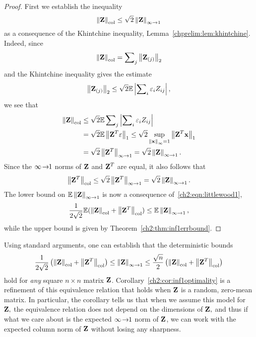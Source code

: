 \begin{proof}
 First we establish the inequality
 \begin{equation}
  \left\|\mathbf{Z}\right\|_{\mathrm{col}} \leq \sqrt{2} \left\|\mathbf{Z}\right\|_{\infty\rightarrow 1}
  \label{ch2:eqn:littlewood1}
 \end{equation}
as a consequence of the Khintchine inequality, Lemma~\ref{chprelim:lem:khintchine}.
Indeed, since 
\[
 \left\|\mathbf{Z}\right\|_{\mathrm{col}} = \sum\nolimits_j \left\|\mathbf{Z}_{(j)}\right\|_2  
\]
and the Khintchine inequality gives the estimate
\[
 \left\|\mathbf{Z}_{(j)}\right\|_2 \leq \sqrt{2} \mathbb{E} \left| \sum\nolimits_i \varepsilon_i Z_{ij} \right|,
\]
we see that
\begin{align*}
 \left\|\mathbf{Z}\right\|_{\mathrm{col}} & \leq \sqrt{2} \mathbb{E} \sum\nolimits_j \left| \sum\nolimits_i \varepsilon_i Z_{ij} \right| \\
     & = \sqrt{2} \mathbb{E} \left\|\mathbf{Z}^T \mathbf{\varepsilon}\right\|_1 
        \leq \sqrt{2} \sup_{\left\|\mathbf{x}\right\|_\infty = 1} \left\|\mathbf{Z}^T \mathbf{x}\right\|_1 \\
     & = \sqrt{2} \left\|\mathbf{Z}^T\right\|_{\infty\rightarrow 1} = \sqrt{2} \left\|\mathbf{Z}\right\|_{\infty\rightarrow 1}.
\end{align*}
Since the $\infty\!\rightarrow\!\!1$ norms of $\mathbf{Z}$ and $\mathbf{Z}^T$ are equal, it also follows that
\[
 \left\|\mathbf{Z}^T\right\|_{\mathrm{col}} \leq \sqrt{2} \left\|\mathbf{Z}^T\right\|_{\infty\rightarrow 1} = \sqrt{2} \left\|\mathbf{Z}\right\|_{\infty\rightarrow 1}.
\]
The lower bound on $ \mathbb{E}\left\|\mathbf{Z}\right\|_{\infty\rightarrow 1}$ is now a consequence of~\eqref{ch2:eqn:littlewood1},
\[
 \frac{1}{2 \sqrt{2}} \mathbb{E}(\left\|\mathbf{Z}\right\|_{\mathrm{col}} + \left\|\mathbf{Z}^T\right\|_{\mathrm{col}}) \leq 
 \mathbb{E}\left\|\mathbf{Z}\right\|_{\infty\rightarrow 1},
\]
while the upper bound is given by Theorem~\ref{ch2:thm:inf1errbound}.
\end{proof}

\begin{remark}
 Using standard arguments, one can establish that the deterministic bounds 
 \[
  \frac{1}{2\sqrt{2}} \left(\left\|\mathbf{Z}\right\|_{\mathrm{col}} + \left\|\mathbf{Z}^T\right\|_{\mathrm{col}}\right) \leq 
  \left\|\mathbf{Z}\right\|_{\infty\rightarrow 1} 
  \leq \frac{\sqrt{n}}{2}\left(\left\|\mathbf{Z}\right\|_{\mathrm{col}} + \left\|\mathbf{Z}^T\right\|_{\mathrm{col}}\right)
 \]
 hold for \emph{any} square $n \times n$ matrix $\mathbf{Z}$. 
 Corollary~\ref{ch2:cor:inf1optimality} is a 
 refinement of this equivalence relation that holds when $\mathbf{Z}$ is a
 random, zero-mean matrix. In particular, the corollary tells us that when we assume 
 this model for $\mathbf{Z},$ the equivalence relation does not depend on the dimensions
 of $\mathbf{Z},$ and thus if what we care about is the expected $\infty\!\rightarrow\!\!1$ norm of $\mathbf{Z}$, we can
 work with the expected column norm of $\mathbf{Z}$ without losing any sharpness.
\end{remark}

